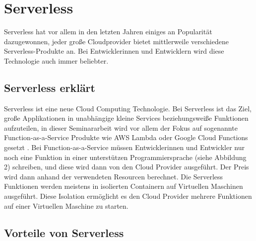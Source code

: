 \section{Serverless}
\label{section:Serverless}

Serverless hat vor allem in den letzten Jahren einiges an Popularität dazugewonnen, jeder große Cloudprovider bietet mittlerweile verschiedene Serverless-Produkte an. Bei Entwicklerinnen und Entwicklern wird diese Technologie auch immer beliebter.

\subsection{Serverless erklärt}

Serverless ist eine neue Cloud Computing Technologie. Bei Serverless ist das Ziel, große Applikationen in unabhängige kleine Services beziehungsweiße Funktionen aufzuteilen, in dieser Seminararbeit wird vor allem der Fokus auf sogenannte Function-as-a-Service Produkte wie AWS Lambda oder Google Cloud Functions gesetzt \autocite[p.~1--3]{sewak}. Bei Function-as-a-Service müssen Entwicklerinnen und Entwickler nur noch eine Funktion in einer unterstützen Programmiersprache (siehe Abbildung 2) schreiben, und diese wird dann von den Cloud Provider ausgeführt. Der Preis wird dann anhand der verwendeten Resourcen berechnet. Die Serverless Funktionen werden meistens in isolierten Containern auf Virtuellen Maschinen ausgeführt. Diese Isolation ermöglicht es den Cloud Provider mehrere Funktionen auf einer Virtuellen Maschine zu starten. \autocite[p.~134--137]{Wang}


\subsection{Vorteile von Serverless}

